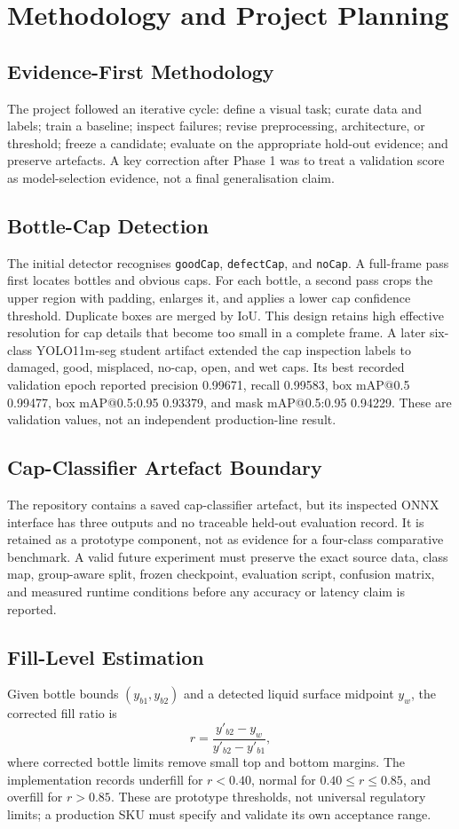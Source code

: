 \documentclass[12pt,a4paper]{report}
\begin{document}
\chapter{Methodology and Project Planning}
\section{Evidence-First Methodology}
The project followed an iterative cycle: define a visual task; curate data and labels; train a baseline; inspect failures; revise preprocessing, architecture, or threshold; freeze a candidate; evaluate on the appropriate hold-out evidence; and preserve artefacts. A key correction after Phase 1 was to treat a validation score as model-selection evidence, not a final generalisation claim.

\section{Bottle-Cap Detection}
The initial detector recognises \texttt{goodCap}, \texttt{defectCap}, and \texttt{noCap}. A full-frame pass first locates bottles and obvious caps. For each bottle, a second pass crops the upper region with padding, enlarges it, and applies a lower cap confidence threshold. Duplicate boxes are merged by IoU. This design retains high effective resolution for cap details that become too small in a complete frame. A later six-class YOLO11m-seg student artifact extended the cap inspection labels to damaged, good, misplaced, no-cap, open, and wet caps. Its best recorded validation epoch reported precision 0.99671, recall 0.99583, box mAP@0.5 0.99477, box mAP@0.5:0.95 0.93379, and mask mAP@0.5:0.95 0.94229. These are validation values, not an independent production-line result.

\section{Cap-Classifier Artefact Boundary}
The repository contains a saved cap-classifier artefact, but its inspected ONNX interface has three outputs and no traceable held-out evaluation record. It is retained as a prototype component, not as evidence for a four-class comparative benchmark. A valid future experiment must preserve the exact source data, class map, group-aware split, frozen checkpoint, evaluation script, confusion matrix, and measured runtime conditions before any accuracy or latency claim is reported.

\section{Fill-Level Estimation}
Given bottle bounds $(y_{b1},y_{b2})$ and a detected liquid surface midpoint $y_w$, the corrected fill ratio is
\begin{equation}r=\frac{y'_{b2}-y_w}{y'_{b2}-y'_{b1}},\end{equation}
where corrected bottle limits remove small top and bottom margins. The implementation records underfill for $r<0.40$, normal for $0.40\leq r\leq0.85$, and overfill for $r>0.85$. These are prototype thresholds, not universal regulatory limits; a production SKU must specify and validate its own acceptance range.
\end{document}
